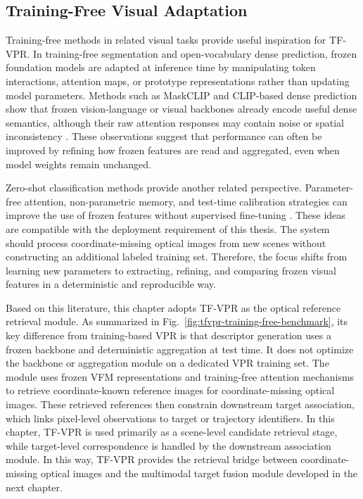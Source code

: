 \subsection{Training-Free Visual Adaptation}
Training-free methods in related visual tasks provide useful inspiration for TF-VPR. In training-free segmentation and open-vocabulary dense prediction, frozen foundation models are adapted at inference time by manipulating token interactions, attention maps, or prototype representations rather than updating model parameters. Methods such as MaskCLIP and CLIP-based dense prediction show that frozen vision-language or visual backbones already encode useful dense semantics, although their raw attention responses may contain noise or spatial inconsistency \cite{ding2023maskclip,sun2024clipasrnn}. These observations suggest that performance can often be improved by refining how frozen features are read and aggregated, even when model weights remain unchanged.

Zero-shot classification methods provide another related perspective. Parameter-free attention, non-parametric memory, and test-time calibration strategies can improve the use of frozen features without supervised fine-tuning \cite{guo2023calip,zanella2024testtime}. These ideas are compatible with the deployment requirement of this thesis. The system should process coordinate-missing optical images from new scenes without constructing an additional labeled training set. Therefore, the focus shifts from learning new parameters to extracting, refining, and comparing frozen visual features in a deterministic and reproducible way.

Based on this literature, this chapter adopts TF-VPR as the optical reference retrieval module. As summarized in Fig.~\ref{fig:tfvpr-training-free-benchmark}, its key difference from training-based VPR is that descriptor generation uses a frozen backbone and deterministic aggregation at test time. It does not optimize the backbone or aggregation module on a dedicated VPR training set. The module uses frozen VFM representations and training-free attention mechanisms to retrieve coordinate-known reference images for coordinate-missing optical images. These retrieved references then constrain downstream target association, which links pixel-level observations to target or trajectory identifiers. In this chapter, TF-VPR is used primarily as a scene-level candidate retrieval stage, while target-level correspondence is handled by the downstream association module. In this way, TF-VPR provides the retrieval bridge between coordinate-missing optical images and the multimodal target fusion module developed in the next chapter.

